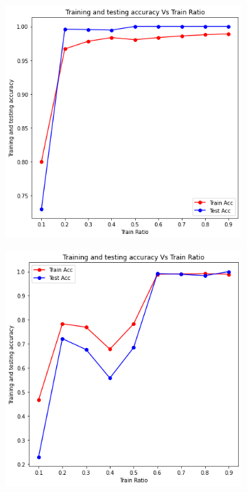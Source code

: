 \begin{figure}[htbp]
    \vspace{.3cm}
    \begin{subfigure}{.45\textwidth}
      \centering
      \includegraphics[width=\linewidth]{imgs/graphcovidnet_4_class_seq_accuracy.png}
      \label{fig:graphcovidnet_4_class_accuracies_seq}
    \end{subfigure}
    \begin{subfigure}{.45\textwidth}
      \centering
      \includegraphics[width=\linewidth]{imgs/graphcovidnet_4_class_fed_accuracy.png}

\end{subfigure}
\end{figure}
